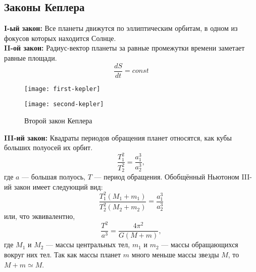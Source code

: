 \subsection{Законы Кеплера}
{\bfseries I-ый закон:} Все планеты движутся по 
эллиптическим орбитам, в одном из фокусов которых 
находится Солнце.\\
{\bfseries II-ой закон:} Радиус-вектор планеты за 
равные промежутки времени заметает равные площади.
\begin{equation}
\frac{dS}{dt}=const
\end{equation}
\begin{figure}[h!]
\begin{minipage}[b]{0.5\textwidth}
\centering
\texttt{[image: first-kepler]}
\caption{Первый закон Кеплера}
\end{minipage}
\begin{minipage}[b]{0.5\textwidth}
\centering
\texttt{[image: second-kepler]}
\caption {Второй закон Кеплера}
\end{minipage}
\end{figure}

{\noindent \bfseries III-ий закон:} Квадраты периодов обращения планет 
относятся, как кубы больших полуосей их орбит.
\begin{equation}
\frac{T^2_1}{T^2_2}=\frac{a^3_1}{a^3_2},
\end{equation}
где $a$ --- большая полуось, $T$ --- период обращения.
Обобщённый Ньютоном III-ий закон имеет следующий вид:
\begin{equation}
\frac{T^2_1(M_1+m_1)}{T^2_2(M_2+m_2)}=\frac{a^3_1}{a^3_2}
\end{equation}
или, что эквивалентно, \begin{equation}
	\frac{T^2}{a^3}=\frac{4\pi^2}{G(M+m)},
\end{equation}
где $M_1$ и $M_2$ --- массы центральных тел, $m_1$ и 
$m_2$ --- массы обращающихся вокруг них тел. Так как массы планет 
$m$ много меньше массы звезды $M$, то $M + m \simeq M$.
